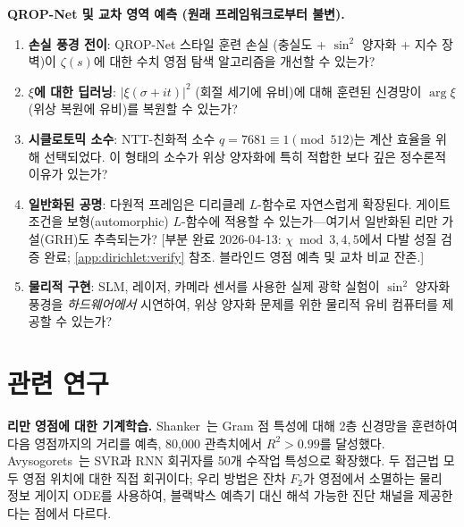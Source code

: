 \documentclass[11pt, a4paper]{article}
\theoremstyle{definition}
\theoremstyle{plain}
\newcommand{\xif}{\xi}
\begin{document}
\smallskip\noindent\textbf{QROP-Net 및 교차 영역 예측 (원래 프레임워크로부터 불변).}

\begin{enumerate}
  \item \textbf{손실 풍경 전이}: QROP-Net 스타일 훈련 손실 (충실도 + $\sin^2$ 양자화 + 지수 장벽)이 $\zeta(s)$에 대한 수치 영점 탐색 알고리즘을 개선할 수 있는가?

  \item \textbf{$\xif$에 대한 딥러닝}: $|\xif(\sigma+it)|^2$ (회절 세기에 유비)에 대해 훈련된 신경망이 $\arg\xif$ (위상 복원에 유비)를 복원할 수 있는가?

  \item \textbf{시클로토믹 소수}: NTT-친화적 소수 $q = 7681 \equiv 1 \pmod{512}$는 계산 효율을 위해 선택되었다. 이 형태의 소수가 위상 양자화에 특히 적합한 보다 깊은 정수론적 이유가 있는가?

  \item \textbf{일반화된 공명}: 다원적 프레임은 디리클레 $L$-함수로 자연스럽게 확장된다. 게이트 조건을 보형(automorphic) $L$-함수에 적용할 수 있는가---여기서 일반화된 리만 가설(GRH)도 추측되는가?
        [부분 완료 2026-04-13: $\chi\bmod 3,4,5$에서 다발 성질 검증 완료; \cref{app:dirichlet:verify} 참조. 블라인드 영점 예측 및 교차 비교 잔존.]


  \item \textbf{물리적 구현}: SLM, 레이저, 카메라 센서를 사용한 실제 광학 실험이 $\sin^2$ 양자화 풍경을 \textit{하드웨어에서} 시연하여, 위상 양자화 문제를 위한 물리적 유비 컴퓨터를 제공할 수 있는가?
\end{enumerate}


\section{관련 연구}
\label{sec:related}

\noindent\textbf{리만 영점에 대한 기계학습.}
Shanker~\cite{Shanker2015NNZeta}는 Gram 점 특성에 대해 2층 신경망을 훈련하여
다음 영점까지의 거리를 예측, 80{,}000 관측치에서 $R^2>0.99$를 달성했다.
Avysogorets~\cite{Avysogorets2021RiemannZeta}는 SVR과 RNN 회귀자를 50개
수작업 특성으로 확장했다.
두 접근법 모두 영점 위치에 대한 직접 회귀이다; 우리 방법은 잔차 $F_2$가
영점에서 소멸하는 물리 정보 게이지 ODE를 사용하여, 블랙박스 예측기 대신
해석 가능한 진단 채널을 제공한다는 점에서 다르다.
\end{document}
